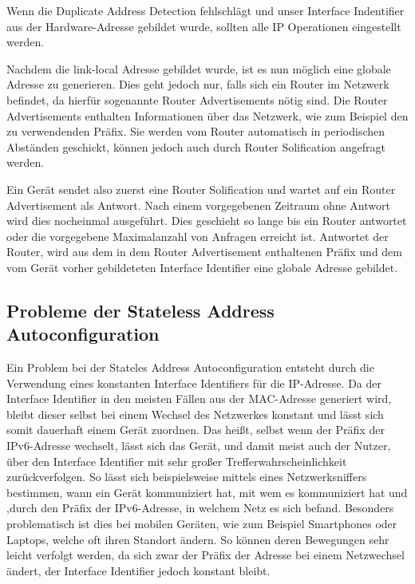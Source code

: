 \documentclass[a4paper, 12pt]{scrartcl}
\begin{document}
Wenn die Duplicate Address Detection fehlschlägt und unser Interface Indentifier aus der Hardware-Adresse gebildet wurde, sollten alle IP Operationen eingestellt werden.

Nachdem die link-local Adresse gebildet wurde, ist es nun möglich eine globale Adresse zu generieren. Dies geht jedoch nur, falls sich ein Router im Netzwerk befindet, da hierfür sogenannte Router Advertisements nötig sind. Die Router Advertisements enthalten Informationen über das Netzwerk, wie zum Beispiel den zu verwendenden Präfix.
Sie werden vom Router automatisch in periodischen Abständen geschickt, können jedoch auch durch Router Solification angefragt werden.

Ein Gerät sendet also zuerst eine Router Solification und wartet auf ein Router Advertisement als Antwort. Nach einem vorgegebenen Zeitraum ohne Antwort wird dies nocheinmal ausgeführt. Dies geschieht so lange bis ein Router antwortet oder die vorgegebene Maximalanzahl von Anfragen erreicht ist. 
Antwortet der Router, wird aus dem in dem Router Advertisement enthaltenen Präfix und dem vom Gerät vorher gebildeteten Interface Identifier eine globale Adresse gebildet.



\newpage
\subsection{Probleme der Stateless Address Autoconfiguration}
Ein Problem bei der Stateles Address Autoconfiguration entsteht durch die Verwendung eines konstanten Interface Identifiers für die IP-Adresse. 
Da der Interface Identifier in den meisten Fällen aus der MAC-Adresse generiert wird, bleibt dieser selbst bei einem Wechsel des Netzwerkes konstant und lässt sich somit dauerhaft einem Gerät zuordnen.
Das heißt, selbst wenn der Präfix der IPv6-Adresse wechselt, lässt sich das Gerät, und damit meist auch der Nutzer, über den Interface Identifier mit sehr großer Trefferwahrscheinlichkeit zurückverfolgen.
So lässt sich beispielsweise mittels eines Netzwerksniffers bestimmen, wann ein Gerät kommuniziert hat, mit wem es kommuniziert hat und ,durch den Präfix der IPv6-Adresse, in welchem Netz es sich befand.
Besonders problematisch ist dies bei mobilen Geräten, wie zum Beispiel Smartphones oder Laptops, welche oft ihren Standort ändern.
So können deren Bewegungen sehr leicht verfolgt werden, da sich zwar der Präfix der Adresse bei einem Netzwechsel ändert, der Interface Identifier jedoch konstant bleibt. 
\end{document}
